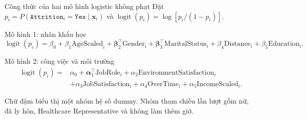 \documentclass[10pt,aspectratio=169]{beamer}
\begin{document}
\begin{frame}{Công thức của hai mô hình logistic không phạt}
  \small
  Đặt $p_i=P(\texttt{Attrition}_i=\texttt{Yes}\mid\mathbf{x}_i)$ và
  $\operatorname{logit}(p_i)=\log[p_i/(1-p_i)]$.
  \vspace{0.12cm}
  \begin{block}{Mô hình 1: nhân khẩu học}
    \[
      \operatorname{logit}(p_i)=\beta_0+\beta_1\text{AgeScaled}_i
      +\boldsymbol\beta_2^{\top}\text{Gender}_i
      +\boldsymbol\beta_3^{\top}\text{MaritalStatus}_i
      +\beta_4\text{Distance}_i+\beta_5\text{Education}_i.
    \]
  \end{block}
  \vspace{0.08cm}
  \begin{block}{Mô hình 2: công việc và môi trường}
    \[
      \begin{aligned}
      \operatorname{logit}(p_i)={}&\alpha_0
      +\boldsymbol\alpha_1^{\top}\text{JobRole}_i
      +\alpha_2\text{EnvironmentSatisfaction}_i\\
      &+\alpha_3\text{JobSatisfaction}_i
      +\alpha_4\text{OverTime}_i
      +\alpha_5\text{IncomeScaled}_i.
      \end{aligned}
    \]
  \end{block}
  \vspace{0.05cm}
  {\scriptsize\color{MutedText}
    Chữ đậm biểu thị một nhóm hệ số dummy. Nhóm tham chiếu lần lượt gồm
    nữ, đã ly hôn, Healthcare Representative và không làm thêm giờ.}
\end{frame}
\end{document}
